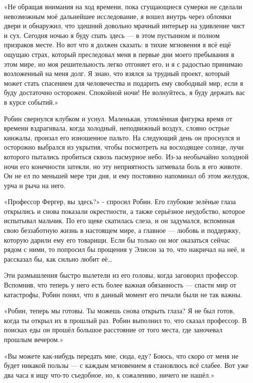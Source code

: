 \documentclass[a4paper,12pt]{book}
\begin{document}
\par
«Не обращая внимания на ход времени, пока сгущающиеся сумерки не сделали невозможным моё дальнейшее исследование, я вошел внутрь через обломки двери и обнаружил, что здешний довольно мрачный интерьер на удивление чист и сух. Сегодня ночью я буду спать здесь — в этом пустынном и полном призраков месте. Но вот что я должен сказать: в тихие мгновения я всё ещё ощущаю страх, который преследовал меня в первые дни моего пребывания в этом мире, но моя решительность легко отгоняет его, и я с радостью принимаю возложенный на меня долг. Я знаю, что взялся за трудный проект, который может стать спасением для человечества и подарить ему свободный мир, если я буду достаточно осторожен. Спокойной ночи! Не волнуйтесь, я буду держать вас в курсе событий.»\\
\par
Робин свернулся клубком и уснул. Маленькая, утомлённая фигурка время от времени вздрагивала, когда холодный, неподвижный воздух, словно острые кинжалы, пронзал его изношенное пальто. На следующий день он проснулся и осторожно выбрался из укрытия, чтобы посмотреть на восходящее солнце, лучи которого пытались пробиться сквозь пасмурное небо. Из-за необычайно холодной ночи его конечности затекли, но эту неприятность затмевала боль в его животе. Он не ел по меньшей мере три дня, и ему постоянно напоминал об этом желудок, урча и рыча на него.\\
\par
«Профессор Фергер, вы здесь?» - спросил Робин. Его глубокие зелёные глаза открылись и снова показали окрестности, а также серьёзное неудобство, которое испытывал мальчик. По его щеке скатилась слеза, и он задумался, вспоминая свою беззаботную жизнь в настоящем мире, а главное — любовь и поддержку, которую дарили ему его товарищи. Если бы только он мог оказаться сейчас рядом с ними, то попросил бы прощения у Элисон за то, что накричал на неё, и рассказал бы, как сильно любит её…
\par
Эти размышления быстро вылетели из его головы, когда заговорил профессор. Вспомнив, что теперь у него есть более важная обязанность — спасти мир от катастрофы, Робин понял, что в данный момент его печали были не так важны.
\par
«Робин, теперь мы готовы. Ты можешь снова открыть глаза? Я не был готов, когда ты открыл их в прошлый раз. Робин выполнил то, что сказал профессор. В поисках еды он прошёл большое расстояние от того места, где заночевал прошлым вечером.»
\par
«Вы можете как-нибудь передать мне, сюда, еду? Боюсь, что скоро от меня не будет никакой пользы — с каждым мгновением я становлюсь всё слабее. Вот уже два часа я ищу что-то съедобное, но, к сожалению, ничего не нашёл.»
\end{document}
